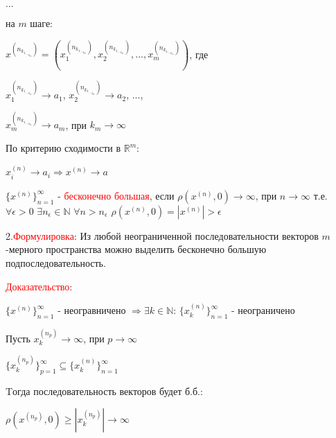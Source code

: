 $...$

на $m$ шаге:

$x^{(n_{{{k_1}_{{...}_{k_m}}}})} = (x^{(n_{{{k_1}_{{...}_{k_m}}}})}_1, x^{(n_{{{k_1}_{{...}_{k_m}}}})}_2, ..., x^{(n_{{{k_1}_{{...}_{k_m}}}})}_m)$, где 

$x^{(n_{{{k_1}_{{...}_{k_m}}}})}_1 \rightarrow a_1$, 
$x^{(n_{{{k_1}_{{...}_{k_m}}}})}_2 \rightarrow a_2$,
$...$,

$x^{(n_{{{k_1}_{{...}_{k_m}}}})}_m \rightarrow a_m$, при  $k_m \rightarrow \infty$
\vspace{1cm}

По критерию сходимости в $\mathbb {R}^m$:

$x^{(n)}_i \rightarrow a_i \Rightarrow x^{(n)} \rightarrow a$
\vspace{1cm}

$\{x^{(n)}\}_{n=1}^{\infty}$ - \textcolor{red}{бесконечно большая}, если $\rho(x^{(n)}, 0) \rightarrow \infty$, при $n \rightarrow \infty$
т.е. $\forall \epsilon > 0$ $\exists n_\epsilon \in \mathbb {N}$ $\forall n>n_\epsilon$ $\rho(x^{(n)}, 0) = |x^{(n)}|>\epsilon$
\vspace{1cm}

2.\textcolor{red}{Формулировка}: Из любой неограниченной последовательности векторов $m$-мерного пространства можно выделить бесконечно большую подпоследовательность.

\textcolor{red}{Доказательство}:

$\{x^{(n)}\}_{n=1}^{\infty}$ - неогравничено $\Rightarrow \exists k \in \mathbb {N}$: $\{x_k^{(n)}\}_{n=1}^{\infty}$ - неограничено

Пусть $x_k^{(n_{{p}})} \rightarrow \infty$, при $p \rightarrow \infty$ 

$\{x_k^{(n_p)}\}_{p=1}^{\infty} \subseteq \{x_k^{(n)}\}_{n=1}^{\infty}$

Tогда последовательность векторов будет б.б.:

$\rho(x^{(n_p)}, 0) \ge |x^{(n_p)}_k| \rightarrow \infty$

